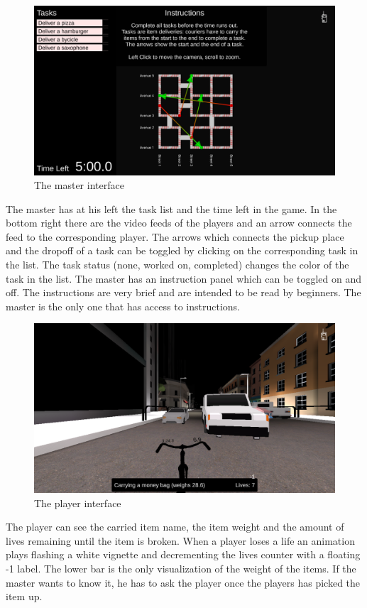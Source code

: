 \documentclass[12pt]{article}
\begin{document}
\begin{figure}[H]
\includegraphics[width=\textwidth]{master}
\caption{The master interface}
\end{figure}
The master has at his left the task list and the time left in the game. In the bottom right there are the video feeds of the players and an arrow connects the feed to the corresponding player. The arrows which connects the pickup place and the dropoff of a task can be toggled by clicking on the corresponding task in the list. The task status (none, worked on, completed) changes the color of the task in the list. The master has an instruction panel which can be toggled on and off. The instructions are very brief and are intended to be read by beginners. The master is the only one that has access to instructions.
\begin{figure}[H]
\includegraphics[width=\textwidth]{gameplay}
\caption{The player interface}
\end{figure}
The player can see the carried item name, the item weight and the amount of lives remaining until the item is broken. When a player loses a life an animation plays flashing a white vignette and decrementing the lives counter with a floating -1 label. The lower bar is the only visualization of the weight of the items. If the master wants to know it, he has to ask the player once the players has picked the item up. 
\end{document}
